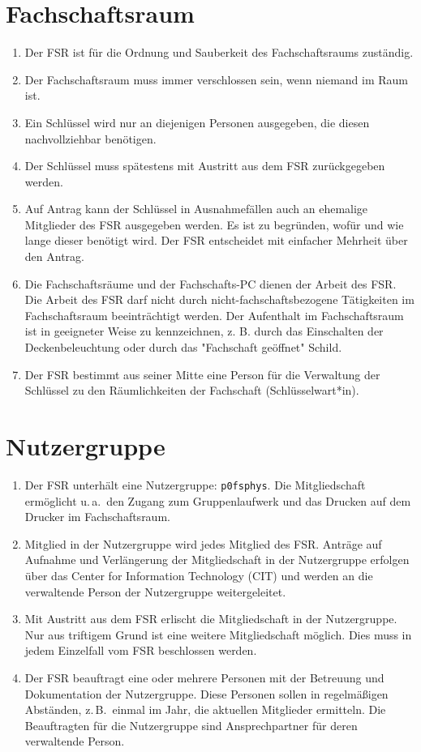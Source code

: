 \section{Fachschaftsraum}
\begin{enumerate}
	\item Der FSR ist für die Ordnung und Sauberkeit des Fachschaftsraums zuständig.
	\item Der Fachschaftsraum muss immer verschlossen sein, wenn niemand im Raum ist.
	\item Ein Schlüssel wird nur an diejenigen Personen ausgegeben, die diesen nachvollziehbar benötigen.
	\item Der Schlüssel muss spätestens mit Austritt aus dem FSR zurückgegeben werden.
	\item Auf Antrag kann der Schlüssel in Ausnahmefällen auch an ehemalige Mitglieder des FSR ausgegeben werden.
	Es ist zu begründen, wofür und wie lange dieser benötigt wird.
	Der FSR entscheidet mit einfacher Mehrheit über den Antrag.
	\item Die Fachschaftsräume und der Fachschafts-PC dienen der Arbeit des FSR. Die Arbeit des FSR darf nicht durch nicht-fachschaftsbezogene Tätigkeiten im Fachschaftsraum beeinträchtigt werden. Der Aufenthalt im Fachschaftsraum ist in geeigneter Weise zu kennzeichnen, z. B. durch das Einschalten der Deckenbeleuchtung oder durch das "Fachschaft geöffnet" Schild.
	\item Der FSR bestimmt aus seiner Mitte eine Person für die Verwaltung der Schlüssel zu den Räumlichkeiten der Fachschaft (Schlüsselwart*in).
\end{enumerate}

\section{Nutzergruppe}
\begin{enumerate}
	\item Der FSR unterhält eine Nutzergruppe: \texttt{p0fsphys}.
	Die Mitgliedschaft ermöglicht u.\,a.\ den Zugang zum Gruppenlaufwerk und das Drucken auf dem Drucker im Fachschaftsraum.
	\item Mitglied in der Nutzergruppe wird jedes Mitglied des FSR.
	Anträge auf Aufnahme und Verlängerung der Mitgliedschaft in der Nutzergruppe erfolgen über das Center for Information Technology (CIT) und werden an die verwaltende Person der Nutzergruppe weitergeleitet.
	\item Mit Austritt aus dem FSR erlischt die Mitgliedschaft in der Nutzergruppe.
	Nur aus triftigem Grund ist eine weitere Mitgliedschaft möglich.
	Dies muss in jedem Einzelfall vom FSR beschlossen werden.
	\item Der FSR beauftragt eine oder mehrere Personen mit der Betreuung und Dokumentation der Nutzergruppe.
	Diese Personen sollen in regelmäßigen Abständen, z.\,B.\ einmal im Jahr, die aktuellen Mitglieder ermitteln.
	Die Beauftragten für die Nutzergruppe sind Ansprechpartner für deren verwaltende Person.
\end{enumerate}


